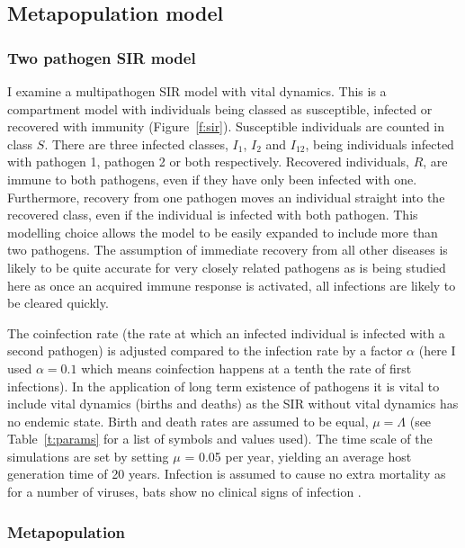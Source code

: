 \subsection{Metapopulation model}




\subsubsection{Two pathogen SIR model}

I examine a multipathogen SIR model with vital dynamics. 
This is a compartment model with individuals being classed as susceptible, infected or recovered with immunity (Figure~\ref{f:sir}).
Susceptible individuals are counted in class $S$.
There are three infected classes, $I_1$, $I_2$ and $I_{12}$, being individuals infected with pathogen 1, pathogen 2 or both respectively.
Recovered individuals, $R$, are immune to both pathogens, even if they have only been infected with one.
Furthermore, recovery from one pathogen moves an individual straight into the recovered class, even if the individual is infected with both pathogen.
This modelling choice allows the model to be easily expanded to include more than two pathogens.
The assumption of immediate recovery from all other diseases is likely to be quite accurate for very closely related pathogens as is being studied here as once an acquired immune response is activated, all infections are likely to be cleared quickly.

The coinfection rate (the rate at which an infected individual is infected with a second pathogen) is adjusted compared to the infection rate by a factor $\alpha$ (here I used $\alpha = 0.1$ which means coinfection happens at a tenth the rate of first infections).
In the application of long term existence of pathogens it is vital to include vital dynamics (births and deaths) as the SIR without vital dynamics has no endemic state.
Birth and death rates are assumed to be equal, $\mu = \Lambda$ (see Table~\ref{t:params} for a list of symbols and values used).
The time scale of the simulations are set by setting $\mu$ = 0.05 per year, yielding an average host generation time of 20 years.
Infection is assumed to cause no extra mortality as for a number of viruses, bats show no clinical signs of infection \cite{halpin2011pteropid, deThoisy2016bioecological}.


\subsubsection{Metapopulation}


